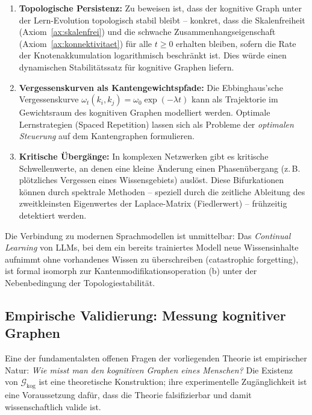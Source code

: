 ﻿\documentclass[12pt,a4paper]{article}
\theoremstyle{plain}
\theoremstyle{definition}
\theoremstyle{remark}
\newcommand{\GG}{\mathcal{G}}
\begin{document}
\begin{enumerate}
  \item \textbf{Topologische Persistenz:} Zu beweisen ist, dass der kognitive Graph unter der Lern-Evolution topologisch stabil bleibt -- konkret, dass die Skalenfreiheit (Axiom~\ref{ax:skalenfrei}) und die schwache Zusammenhangseigenschaft (Axiom~\ref{ax:konnektivitaet}) für alle $t \geq 0$ erhalten bleiben, sofern die Rate der Knotenakkumulation logarithmisch beschränkt ist. Dies würde einen dynamischen Stabilitätssatz für kognitive Graphen liefern.

  \item \textbf{Vergessenskurven als Kantengewichtspfade:} Die Ebbinghaus'sche Vergessenskurve $\omega_t(k_i, k_j) = \omega_0 \exp(-\lambda t)$ kann als Trajektorie im Gewichtsraum des kognitiven Graphen modelliert werden. Optimale Lernstrategien (Spaced Repetition) lassen sich als Probleme der \emph{optimalen Steuerung} auf dem Kantengraphen formulieren.

  \item \textbf{Kritische Übergänge:} In komplexen Netzwerken gibt es kritische Schwellenwerte, an denen eine kleine Änderung einen Phasenübergang (z.\,B. plötzliches Vergessen eines Wissensgebiets) auslöst. Diese Bifurkationen können durch spektrale Methoden -- speziell durch die zeitliche Ableitung des zweitkleinsten Eigenwertes der Laplace-Matrix (Fiedlerwert) -- frühzeitig detektiert werden.
\end{enumerate}

Die Verbindung zu modernen Sprachmodellen ist unmittelbar: Das \emph{Continual Learning} von LLMs, bei dem ein bereits trainiertes Modell neue Wissensinhalte aufnimmt ohne vorhandenes Wissen zu überschreiben (catastrophic forgetting), ist formal isomorph zur Kantenmodifikationsoperation (b) unter der Nebenbedingung der Topologiestabilität.


\subsection{Empirische Validierung: Messung kognitiver Graphen}
\label{subsec:messung}

Eine der fundamentalsten offenen Fragen der vorliegenden Theorie ist empirischer Natur: \emph{Wie misst man den kognitiven Graphen eines Menschen?} Die Existenz von $\GG_{\text{kog}}$ ist eine theoretische Konstruktion; ihre experimentelle Zugänglichkeit ist eine Voraussetzung dafür, dass die Theorie falsifizierbar und damit wissenschaftlich valide ist.
\end{document}
